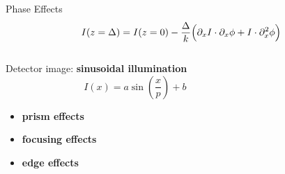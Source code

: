\documentclass[
 ]{beamer}%
\begin{document}
\begin{frame}{Phase Effects}
    \vspace{-0.35cm}
    \begin{equation*}
        I(z=\Delta)=I(z=0)-\frac{\Delta}{k}\Bigl(\partial_xI\cdot \partial_x\phi+I\cdot\partial_x^2\phi\Bigr)
    \end{equation*}

    \vspace{0.25cm}
    \begin{columns}
        \begin{column}{0.5\textwidth}
            Detector image: \textbf{sinusoidal illumination}
            \begin{equation*}
                I(x)=a\sin{\left(\frac{x}{p}\right)}+b
            \end{equation*}
            
            \begin{itemize}
                \item \textbf{prism effects}
                \item \textbf{focusing effects}
                \item \textbf{edge effects}
            \end{itemize}
        \end{column}
        \begin{column}{0.4\textwidth}

            \gratingillumination
        \end{column}
    \end{columns}
    
\end{frame}
\end{document}
